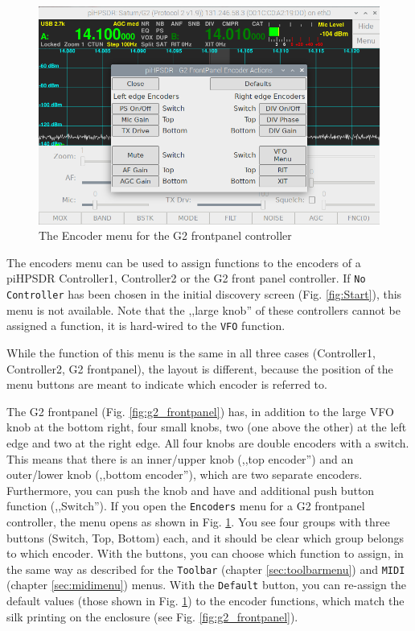 \documentclass[12pt]{book}
\def\rett#1{\texttt{\color{red}#1}}
\def\bltt#1{\texttt{\color{blue}#1}}
\begin{document}
\begin{figure}[ht]
\center
\includegraphics[width=12cm]{EncoderMenuG2.png}
\caption{The Encoder menu for the G2 frontpanel controller}
\label{fig:EncoderMenuG2}
\end{figure}
The encoders menu can be used to assign functions to the encoders of a
piHPSDR Controller1, Controller2 or the G2 front panel controller.
If \texttt{No Controller} has been chosen in the initial discovery screen
(Fig. \ref{fig:Start}), this menu is not available.
Note that the ,,large knob'' of these controllers
cannot be assigned a function, it is hard-wired to the \bltt{VFO} function.



While the function of this menu is the same in all three cases (Controller1, Controller2,
G2 frontpanel), the layout is different, because the position of the menu buttons
are meant to indicate which encoder is referred to.



The G2 frontpanel (Fig. \ref{fig:g2_frontpanel}) has,
in addition to the large VFO knob at the bottom right,
four small knobs, two (one above the other)
at the left edge and two at the right edge. All four knobs are double encoders with
a switch. This means that there is an inner/upper knob (,,top encoder'')
and an outer/lower knob (,,bottom encoder''), which
are two separate encoders. Furthermore, you can push the knob and have and additional
push button function (,,Switch''). If you open the \bltt{Encoders} menu for
a G2 frontpanel controller, the menu opens as shown in Fig. \ref{fig:EncoderMenuG2}.
You see four groups with three buttons (Switch, Top, Bottom) each, and it should be
clear which group belongs to which encoder. With the buttons, you can choose which function
to assign, in the same way as described for the \bltt{Toolbar} (chapter \ref{sec:toolbarmenu})
and \bltt{MIDI} (chapter \ref{sec:midimenu}) menus. With the \rett{Default} button, you can
re-assign the default values (those shown in Fig. \ref{fig:EncoderMenuG2})
to the encoder functions, which match the silk printing
on the enclosure (see Fig. \ref{fig:g2_frontpanel}).
\end{document}

